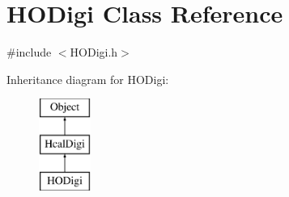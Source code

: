 \hypertarget{class_h_o_digi}{}\section{H\+O\+Digi Class Reference}
\label{class_h_o_digi}


{\ttfamily \#include $<$H\+O\+Digi.\+h$>$}

Inheritance diagram for H\+O\+Digi\+:\begin{figure}[H]
\begin{center}
\leavevmode
\includegraphics[height=3.000000cm]{class_h_o_digi}
\end{center}
\end{figure}
